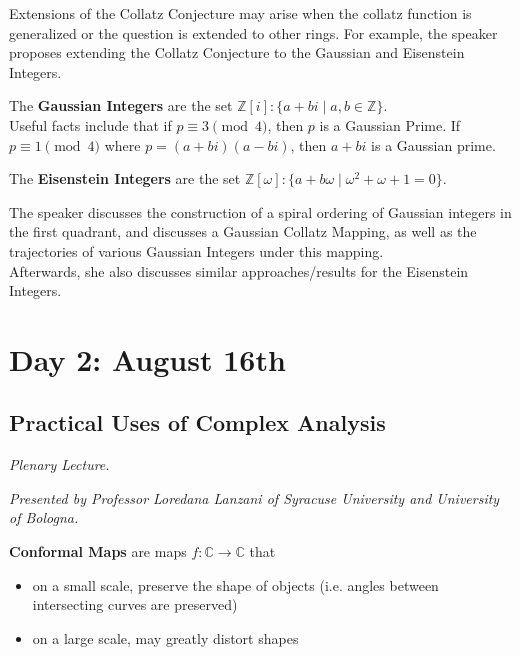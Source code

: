 \documentclass[12pt]{amsart}
\begin{document}
Extensions of the Collatz Conjecture may arise when the collatz function is generalized or the question is extended to other rings. For example, the speaker proposes extending the Collatz Conjecture to the Gaussian and Eisenstein Integers.

\begin{definition}
The \textbf{Gaussian Integers} are the set $\mathbb{Z}[i] : \{ a + bi \mid a, b \in \mathbb{Z} \}.$ \\
    
Useful facts include that if $p \equiv 3 \pmod 4$, then $p$ is a Gaussian Prime. If $p \equiv 1 \pmod 4$ where $p = (a+bi)(a-bi)$, then $a+bi$ is a Gaussian prime.
\end{definition}

\begin{definition}
The \textbf{Eisenstein Integers} are the set $\mathbb{Z}[\omega] : \{ a + b\omega \mid \omega^2 + \omega + 1 = 0 \}.$ \\
\end{definition}

\begin{result*}
The speaker discusses the construction of a spiral ordering of Gaussian integers in the first quadrant, and discusses a Gaussian Collatz Mapping, as well as the trajectories of various Gaussian Integers under this mapping. \\

Afterwards, she also discusses similar approaches/results for the Eisenstein Integers.
\end{result*}

\newpage

\section{Day 2: August 16th}

\subsection{Practical Uses of Complex Analysis}

\textit{Plenary Lecture.}
\vspace{0.25cm}

\textit{Presented by Professor Loredana Lanzani of Syracuse University and University of Bologna.}

\begin{definition}
\textbf{Conformal Maps} are maps $f: \mathbb{C} \rightarrow \mathbb{C}$ that
\begin{itemize}
    \item on a small scale, preserve the shape of objects (i.e. angles between intersecting curves are preserved) 
    \item on a large scale, may greatly distort shapes
\end{itemize}

\end{definition}
\end{document}
